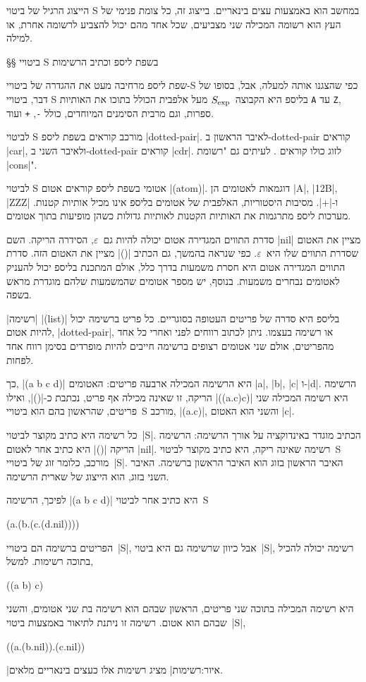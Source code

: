הייצוג הרגיל של ביטוי S במחשב הוא באמצעות עצים בינאריים. בייצוג זה, כל צומת
פנימי של העץ הוא רשומה המכילה שני מצביעים, שכל אחד מהם יכול להצביע לרשומה אחרת,
או למילה.

§§ ביטויי S בשפת ליספ וכתיב הרשימות

שפת ליספ מרחיבה מעט את ההגדרה של ביטויי-S כפי שהצגנו אותה למעלה, אבל, בסופו של
דבר, ביטויי S בליספ היא הקבוצה~$S_{\text{exp}}$ מעל אלפבית הכולל בתוכו את האותיות
\texttt{A} עד \texttt{Z}, ספרות, וגם מרבית הסימנים המיוחדים, כולל \texttt{-},
\texttt{+} ועוד.

לביטוי S מורכב קוראים בשפת ליספ \E|dotted-pair|. לאיבר הראשון ב-dotted-pair
קוראים \E|car|, ולאיבר השני ב-dotted-pair קוראים \E|cdr|. לזוג כולו קוראים
.
לעיתים גם "רשומת \E|cons|".

לביטוי S אטומי בשפת ליספ קוראים אטום \E|(atom)|. דוגמאות לאטומים הן \E|A|,
\E|12B|, \E|ZZZ| ו-\E|+|. מסיבות היסטוריות, האלפבית של אטומים בליספ אינו מכיל
אותיות קטנות. מערכות ליספ מתרגמות את האותיות הקטנות לאותיות גדולות כשהן מופיעות
בתוך אטומים.

סדרת התווים המגדירה אטום יכולה להיות גם~$ε$, הסידרה הריקה. השם \E|nil| מציין את
האטום שסדרת התווים שלו היא~$ε$. כפי שנראה בהמשך, גם הכתיב \E|()| מציין את האטום
הזה. סדרת התווים המגדירה אטום היא חסרת משמעות בדרך כלל, אולם המתכנת בליספ יכול
להעניק לאטומים נבחרים משמעות. בנוסף, יש מספר אטומים שהמשמעות שלהם מוגדרת מראש
בשפה.

\ע|רשימה| \E|(list)| בליספ היא סדרה של פריטים העטופה בסוגריים. כל פריט ברשימה
יכול להיות אטום, \E|dotted-pair|, או רשימה בעצמו. ניתן לכתוב רווחים לפני ואחרי
כל אחד מהפריטים, אולם שני אטומים רצופים ברשימה חייבים להיות מופרדים בסימן רווח
אחד לפחות.

כך, \E|(a b c d)| היא הרשימה המכילה ארבעה פריטים: האטומים \E|a|, \E|b|, \E|c|
ו-\E|d|. הרשימה הריקה, זו שאינה מכילה אף פריט, נכתבת כ-\E|()|, ואילו
\E|((a.c)c)| היא רשימה המכילה שני פריטים, שהראשון בהם הוא ביטויי~S מורכב,
\E|(a.c)|, והשני הוא האטום \E|c|.

כל רשימה היא כתיב מקוצר לביטוי~\E|S|. הכתיב מוגדר באינדוקציה על אורך הרשימה:
הרשימה הריקה \E|()| היא כתיב אחר לאטום \E|nil|. רשימה שאינה ריקה, היא כתיב
מקוצר לביטוי~S מורכב, כלומר זוג של ביטויי~\E|S|. האיבר הראשון בזוג הוא האיבר
הראשון ברשימה. האיבר השני בזוג, הוא הייצוג של שארית הרשימה.

לפיכך, הרשימה \E|(a b c d)| היא כתיב אחר לביטוי~S
\begin{LISP}
(a.(b.(c.(d.nil))))
\end{LISP}

הפריטים ברשימה הם ביטויי~\E|S|, אבל כיוון שרשימה גם היא ביטוי~\E|S|, רשימה
יכולה להכיל בתוכה רשימות. למשל,
\begin{LISP}
  ((a b) c)
\end{LISP}
היא רשימה המכילה בתוכה שני פריטים, הראשון שבהם הוא רשימה בת שני אטומים, והשני
שבהם הוא אטום. רשימה זו ניתנת לתיאור באמצעות ביטוי~\E|S|,
\begin{LISP}
  ((a.(b.nil)).(c.nil))
\end{LISP}
|איור:רשימות| מציג רשימות אלו כעצים בינאריים מלאים.

